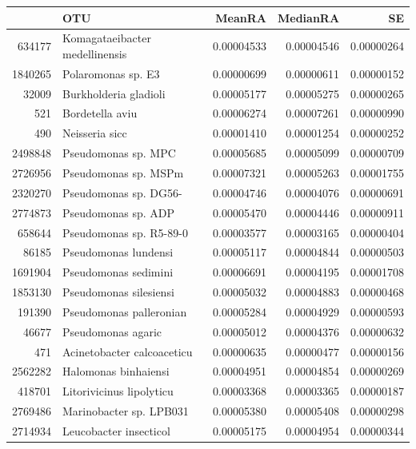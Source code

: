 \begin{table}[ht]
\centering
\begin{tabular}{rlrrr}
  \hline
 & OTU & MeanRA & MedianRA & SE \\ 
  \hline
634177 & Komagataeibacter medellinensis & 0.00004533 & 0.00004546 & 0.00000264 \\ 
  1840265 & Polaromonas sp. E3 & 0.00000699 & 0.00000611 & 0.00000152 \\ 
  32009 & Burkholderia gladioli & 0.00005177 & 0.00005275 & 0.00000265 \\ 
  521 & Bordetella aviu & 0.00006274 & 0.00007261 & 0.00000990 \\ 
  490 & Neisseria sicc & 0.00001410 & 0.00001254 & 0.00000252 \\ 
  2498848 & Pseudomonas sp. MPC & 0.00005685 & 0.00005099 & 0.00000709 \\ 
  2726956 & Pseudomonas sp. MSPm & 0.00007321 & 0.00005263 & 0.00001755 \\ 
  2320270 & Pseudomonas sp. DG56- & 0.00004746 & 0.00004076 & 0.00000691 \\ 
  2774873 & Pseudomonas sp. ADP & 0.00005470 & 0.00004446 & 0.00000911 \\ 
  658644 & Pseudomonas sp. R5-89-0 & 0.00003577 & 0.00003165 & 0.00000404 \\ 
  86185 & Pseudomonas lundensi & 0.00005117 & 0.00004844 & 0.00000503 \\ 
  1691904 & Pseudomonas sedimini & 0.00006691 & 0.00004195 & 0.00001708 \\ 
  1853130 & Pseudomonas silesiensi & 0.00005032 & 0.00004883 & 0.00000468 \\ 
  191390 & Pseudomonas palleronian & 0.00005284 & 0.00004929 & 0.00000593 \\ 
  46677 & Pseudomonas agaric & 0.00005012 & 0.00004376 & 0.00000632 \\ 
  471 & Acinetobacter calcoaceticu & 0.00000635 & 0.00000477 & 0.00000156 \\ 
  2562282 & Halomonas binhaiensi & 0.00004951 & 0.00004854 & 0.00000269 \\ 
  418701 & Litorivicinus lipolyticu & 0.00003368 & 0.00003365 & 0.00000187 \\ 
  2769486 & Marinobacter sp. LPB031 & 0.00005380 & 0.00005408 & 0.00000298 \\ 
  2714934 & Leucobacter insecticol & 0.00005175 & 0.00004954 & 0.00000344 \\ 

\end{tabular}
\end{table}
